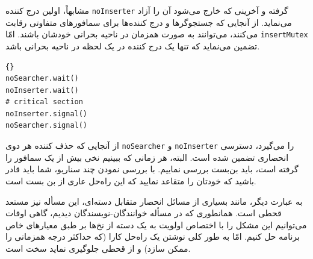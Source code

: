 \documentclass{book}
\begin{document}

    مشابهاً، اولین درج کننده {\tt noInserter} گرفته و آخرینی که خارج می‌شود آن را آزاد می‌نماید.
    از آنجایی که جستجوگرها و درج کننده‌ها برای سمافورهای متفاوتی رقابت می‌کنند، می‌توانند به صورت همزمان در ناحیه بحرانی خودشان 
    باشند. امّا {\tt insertMutex} تضمین می‌نماید که تنها یک درج کننده در یک لحظه‌ در ناحیه بحرانی باشد. 

\begin{latin}
\begin{lstlisting}[title={راه حل جستجو-درج-حذف (حذف کننده)}]{}
noSearcher.wait()
noInserter.wait()
# critical section
noInserter.signal()
noSearcher.signal()

\end{lstlisting}
\end{latin}

    از آنجایی که حذف کننده هر دوی  {\tt noSearcher} و {\tt noInserter} را می‌گیرد، دسترسی انحصاری تضمین شده است. 
    البته، هر زمانی که ببینیم نخی بیش از یک سمافور را گرفته است، باید بن‌بست بررسی نماییم. با بررسی نمودن چند سناریو، 
    شما باید قادر باشید که خودتان را متقاعد نمایید که این راه‌حل عاری از بن بست است. 

    به عبارت دیگر، مانند بسیاری از مسائل انحصار متقابل دسته‌ای، این مسأله نیز مستعد قحطی است. 
    همانطوری که در مسأله خوانندگان-نویسندگان دیدیم، گاهی اوقات می‌توانیم این مشکل را با اختصاص اولویت به یک دسته از نخ‌ها 
    بر طبق معیارهای خاص برنامه حل کنیم. 
    امّا به طور کلی نوشتن یک راه‌حل کارا (که حداکثر درجه همزمانی را ممکن سازد) و از قحطی جلوگیری نماید سخت است. 
\end{document}
